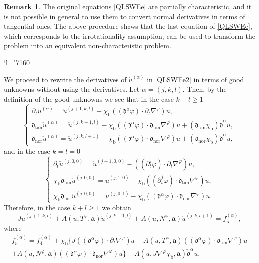 \documentclass[11pt]{article}
\newcommand{\Changel}{\mathcode`l="7160}
\newcommand{\dtan}{{\mathfrak d}_\mathrm{tan}}
\newcommand{\dnor}{{\mathfrak d}_\mathrm{nor}}
\newcommand{\dt}{\partial_t}
\newcommand{\cmfalpha}{\check{\mathfrak{d}}^{\alpha}}
\theoremstyle{definition}
\newtheorem{remark}[theorem]{Remark}
\begin{document}
\begin{remark}
The original equations \eqref{QLSWEe} are partially characteristic,
and it is not possible in general to use them to convert normal derivatives in terms of tangential ones.
The above procedure shows that the last equation of \eqref{QLSWEe}, which corresponds to the irrotationality assumption,
can be used to transform the problem into an equivalent non-characteristic problem.
\end{remark}

\Changel

We proceed to rewrite the derivatives of $\check{u}^{(\alpha)}$ in \eqref{QLSWEe2} in terms of good unknowns without using the derivatives.
Let $\alpha=(j,k,l)$.
Then, by the definition of the good unknowns we see that in the case $k+l\geq1$
\begin{equation}\label{DGU1}
\begin{cases}
\dt\check{u}^{(\alpha)} = \check{u}^{(j+1,k,l)} - \chi_\mathrm{b}((\mathfrak{d}^\alpha\varphi)\cdot\dt\nabla^\varphi)u, \\
\dtan\check{u}^{(\alpha)} = \check{u}^{(j,k+1,l)} - \chi_\mathrm{b}((\mathfrak{d}^\alpha\varphi)\cdot\dtan\nabla^\varphi)u
+ (\dtan\chi_\mathrm{b}) \cmfalpha u, \\
\dnor\check{u}^{(\alpha)} = \check{u}^{(j,k,l+1)} - \chi_\mathrm{b}((\mathfrak{d}^\alpha\varphi)\cdot\dnor\nabla^\varphi)u
+ (\dnor\chi_\mathrm{b}) \cmfalpha u,
\end{cases}
\end{equation}
and in the case $k=l=0$
\begin{equation}\label{DGU2}
\begin{cases}
\dt\check{u}^{(j,0,0)} = \check{u}^{(j+1,0,0)} - ((\dt^j\varphi)\cdot\dt\nabla^\varphi)u, \\
\chi_\mathrm{b}\dtan\check{u}^{(j,0,0)} = \check{u}^{(j,1,0)} - \chi_\mathrm{b}((\dt^j\varphi)\cdot\dtan\nabla^\varphi)u, \\
\chi_\mathrm{b}\dnor\check{u}^{(j,0,0)} = \check{u}^{(j,0,1)} - \chi_\mathrm{b}((\mathfrak{d}^\alpha\varphi)\cdot\dnor\nabla^\varphi)u.
\end{cases}
\end{equation}
Therefore, in the case $k+l\geq1$ we obtain
\begin{equation}\label{QLSWEe3}
J\check{u}^{(j+1,k,l)}+A(u,T^\varphi,\bm{a})\check{u}^{(j,k+1,l)}+A(u,N^\varphi,\bm{a})\check{u}^{(j,k,l+1)}=f_5^{(\alpha)},
\end{equation}
where
\begin{multline*}
f_5^{(\alpha)}
= f_4^{(\alpha)} + \chi_\mathrm{b} \{ J((\mathfrak{d}^\alpha\varphi)\cdot\dt\nabla^\varphi)u
+ A(u,T^\varphi,\bm{a})((\mathfrak{d}^\alpha\varphi)\cdot\dtan\nabla^\varphi)u \\
+ A(u,N^\varphi,\bm{a})((\mathfrak{d}^\alpha\varphi)\cdot\dnor\nabla^\varphi)u \}
- A(u,J\nabla^\varphi\chi_\mathrm{b},\bm{a}) \cmfalpha u.
\end{multline*}
\end{document}
